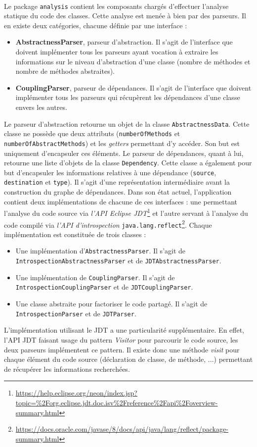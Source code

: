 \documentclass{scrartcl}
\begin{document}
    \paragraph{}Le package \texttt{analysis} contient les composants chargés d'effectuer l'analyse statique du code des classes. Cette analyse est menée à bien par des parseurs. Il en existe deux catégories, chacune définie par une interface :
    \begin{itemize}
    	\item \textbf{AbstractnessParser}, parseur d'abstraction. Il s'agit de l'interface que doivent implémenter tous les parseurs ayant vocation à extraire les informations sur le niveau d'abstraction d'une classe (nombre de méthodes et nombre de méthodes abstraites).
    	\item \textbf{CouplingParser}, parseur de dépendances. Il s'agit de l'interface que doivent implémenter tous les parseurs qui récupèrent les dépendances d'une classe envers les autres.
    \end{itemize}
    Le parseur d'abstraction retourne un objet de la classe \texttt{AbstractnessData}. Cette classe ne possède que deux attributs (\texttt{numberOfMethods} et \texttt{numberOfAbstractMethods}) et les \textit{getters} permettant d'y accéder. Son but est uniquement d'encapsuler ces éléments.
    Le parseur de dépendances, quant à lui, retourne une liste d'objets de la classe \texttt{Dependency}. Cette classe a également pour but d'encapsuler les informations relatives à une dépendance (\texttt{source}, \texttt{destination} et \texttt{type}). Il s'agit d'une représentation intermédiaire avant la construction du graphe de dépendances.
    Dans son état actuel, l'application contient deux implémentations de chacune de ces interfaces : une permettant l'analyse du code source via \emph{l'API Eclipse JDT}\footnote{\url{https://help.eclipse.org/neon/index.jsp?topic=\%2Forg.eclipse.jdt.doc.isv\%2Freference\%2Fapi\%2Foverview-summary.html}} et l'autre servant à l'analyse du code compilé via \emph{l'API d'introspection} \texttt{java.lang.reflect}\footnote{\url{https://docs.oracle.com/javase/8/docs/api/java/lang/reflect/package-summary.html}}. Chaque implémentation est constituée de trois classes :
    \begin{itemize}
    	\item Une implémentation d'\texttt{AbstractnessParser}. Il s'agit de \texttt{IntrospectionAbstractnessParser} et de \texttt{JDTAbstractnessParser}.
    	\item Une implémentation de \texttt{CouplingParser}. Il s'agit de \texttt{IntrospectionCouplingParser} et de \texttt{JDTCouplingParser}.
    	\item Une classe abstraite pour factoriser le code partagé. Il s'agit de \texttt{IntrospectionParser} et de \texttt{JDTParser}.
	\end{itemize}
	L'implémentation utilisant le JDT a une particularité supplémentaire. En effet, l'API JDT faisant usage du pattern \emph{Visitor} pour parcourir le code source, les deux parseurs implémentent ce pattern. Il existe donc une méthode \emph{visit} pour chaque élément du code source (déclaration de classe, de méthode, ...) permettant de récupérer les informations recherchées.
	
\end{document}
